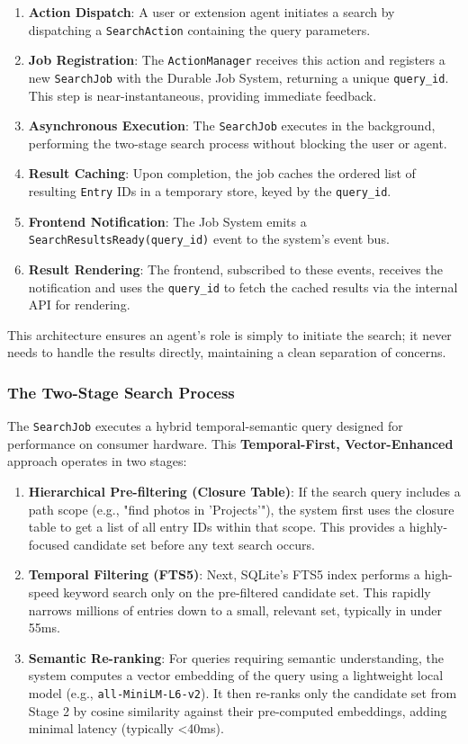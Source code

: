 \documentclass[sigconf]{acmart}
\begin{document}
\begin{enumerate}[noitemsep, topsep=0pt]
    \item \textbf{Action Dispatch}: A user or extension agent initiates a search by dispatching a \texttt{SearchAction} containing the query parameters.
    \item \textbf{Job Registration}: The \texttt{ActionManager} receives this action and registers a new \texttt{SearchJob} with the Durable Job System, returning a unique \texttt{query\_id}. This step is near-instantaneous, providing immediate feedback.
    \item \textbf{Asynchronous Execution}: The \texttt{SearchJob} executes in the background, performing the two-stage search process without blocking the user or agent.
    \item \textbf{Result Caching}: Upon completion, the job caches the ordered list of resulting \texttt{Entry} IDs in a temporary store, keyed by the \texttt{query\_id}.
    \item \textbf{Frontend Notification}: The Job System emits a \texttt{SearchResultsReady(query\_id)} event to the system's event bus.
    \item \textbf{Result Rendering}: The frontend, subscribed to these events, receives the notification and uses the \texttt{query\_id} to fetch the cached results via the internal API for rendering.
\end{enumerate}

This architecture ensures an agent's role is simply to initiate the search; it never needs to handle the results directly, maintaining a clean separation of concerns.

\subsubsection{The Two-Stage Search Process}
The \texttt{SearchJob} executes a hybrid temporal-semantic query designed for performance on consumer hardware. This \textbf{Temporal-First, Vector-Enhanced} approach operates in two stages:

\begin{enumerate}[noitemsep, topsep=0pt]
    \item \textbf{Hierarchical Pre-filtering (Closure Table)}: If the search query includes a path scope (e.g., "find photos in 'Projects'"), the system first uses the closure table to get a list of all entry IDs within that scope. This provides a highly-focused candidate set before any text search occurs.
    \item \textbf{Temporal Filtering (FTS5)}: Next, SQLite's FTS5 index performs a high-speed keyword search only on the pre-filtered candidate set. This rapidly narrows millions of entries down to a small, relevant set, typically in under 55ms.
    \item \textbf{Semantic Re-ranking}: For queries requiring semantic understanding, the system computes a vector embedding of the query using a lightweight local model (e.g., \texttt{all-MiniLM-L6-v2}). It then re-ranks only the candidate set from Stage 2 by cosine similarity against their pre-computed embeddings, adding minimal latency (typically <40ms).
\end{enumerate}
\end{document}
